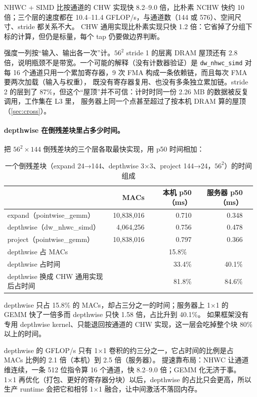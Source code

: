 \documentclass[11pt,a4paper]{ctexart}
\begin{document}
NHWC + SIMD 比按通道的 CHW 实现快 8.2--9.0 倍，比朴素 NCHW 快约 10 倍；三个层的速度都在 10.4--11.4 GFLOP/s，与通道数（144 或 576）、空间尺寸、stride 都关系不大。
CHW 通用实现比朴素实现只快 1.2 倍：它省掉了分组下标的计算，但仍是标量，每个 tap 仍要做边界判断。

强度一列按“输入、输出各一次”计。$56^2$ stride 1 的层离 DRAM 屋顶还有 2.8 倍，说明瓶颈不是带宽。一个可能的解释（没有计数器验证）是
\texttt{dw\_nhwc\_simd} 对每 16 个通道只用一个累加寄存器，9 次 FMA 构成一条依赖链，而且每次 FMA 要两次加载（输入与权重），
既没有寄存器复用、也没有多条独立累加链。stride 2 的层到了 87\%，但这个“屋顶”并不可信：计时时同一份 2.26 MB 的数据被反复调用，工作集在 L3 里，
服务器上同一个点甚至超过了按本机 DRAM 算的屋顶（\cref{sec:cross}）。

\paragraph{depthwise 在倒残差块里占多少时间。} 把 $56^2\times144$ 倒残差块的三个层各取最快实现，用 p50 时间相加：

\begin{table}[H]
\centering\small
\caption{一个倒残差块（expand 24→144、depthwise 3×3、project 144→24，$56^2$）的时间组成}\label{tab:block}
\begin{tabular}{lrrrr}
\toprule
 & MACs & 本机 p50（ms） & 服务器 p50（ms） \\
\midrule
expand（pointwise\_gemm） & 10,838,016 & 0.710 & 0.348 \\
depthwise（dw\_nhwc\_simd） & 4,064,256 & 0.756 & 0.478 \\
project（pointwise\_gemm） & 10,838,016 & 0.797 & 0.366 \\
\midrule
depthwise 占 MACs & \multicolumn{3}{c}{15.8\%} \\
depthwise 占时间 & & 33.4\% & 40.1\% \\
depthwise 换成 CHW 通用实现后占时间 & & 81.8\% & 84.6\% \\
\bottomrule
\end{tabular}
\end{table}

depthwise 只占 15.8\% 的 MACs，却占三分之一的时间；服务器上 1×1 的 GEMM 快了一倍多而 depthwise 只快 1.58 倍，占比升到 40.1\%。
如果框架没有专用 depthwise kernel、只能退回按通道的 CHW 实现，这一层会吃掉整个块 80\% 以上的时间。

\begin{findingbox}
depthwise 的 GFLOP/s 只有 1×1 卷积的约三分之一，它占时间的比例是占 MACs 比例的 2.1 倍（本机）到 2.5 倍（服务器）。
提速靠布局：NHWC 让通道维连续，一条 512 位指令算 16 个通道，快 8.2--9.0 倍；GEMM 化无济于事。
1×1 再优化（打包、更好的寄存器分块）以后，depthwise 的占比只会更高，所以生产 runtime 会把它和相邻 1×1 融合，让中间激活不落回内存。
\end{findingbox}
\end{document}

